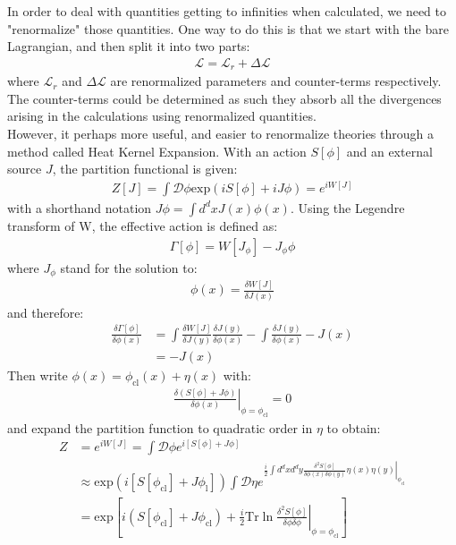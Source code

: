 \documentclass[fleqn]{article}
\begin{document}
In order to deal with quantities getting to infinities when calculated, we need to "renormalize" those quantities. One way to do this is that we start with the bare Lagrangian, and then split it into two parts:
\begin{align}
\mathcal{L} = \mathcal{L}_{r} + \Delta \mathcal{L}
\end{align}
where $\mathcal{L}_r$ and $\Delta \mathcal{L}$ are renormalized parameters and counter-terms respectively. The counter-terms could be determined as such they absorb all the divergences arising in the calculations using renormalized quantities. \\
\indent However, it perhaps more useful, and easier to renormalize theories through a method called Heat Kernel Expansion. With an action $S[\phi]$ and an external source $J$, the partition functional is given:
\begin{align}
Z[J] = \int \mathcal{D} \phi \text{exp}(iS[\phi] + iJ\phi) = e^{iW[J]}
\end{align}
with a shorthand notation $J\phi = \int d^{d} xJ(x) \phi(x)$. Using the Legendre transform of W, the effective action is defined as:
\begin{align}
\Gamma[\phi] = W[J_{\phi}] - J_{\phi}\phi
\end{align}
where $J_{\phi}$ stand for the solution to:
\begin{align}
\phi(x) = \frac{\delta W[J]}{\delta J(x)}
\end{align}
and therefore:
\begin{align}
\frac{\delta \Gamma[\phi]}{\delta \phi (x)} &= \int \frac{\delta W[J]}{\delta J(y)} \frac {\delta J(y)}{\delta \phi (x)} - \int \frac{\delta J(y)}{\delta \phi (x) }  - J(x) \nonumber \\
&= -J(x)
\end{align}
Then write $\phi (x)= \phi _{\text{cl}} (x)+ \eta(x)$ with:
\begin{align}
\left. \frac{\delta (S[\phi] + J\phi)}{\delta \phi (x)} \right|_{\phi = \phi_{\text{cl}}} = 0
\end{align}
and expand the partition function to quadratic order in $\eta$ to obtain:
\begin{align}
Z&= e^{iW[J]} = \int \mathcal{D} \phi e^{i[S[\phi] + J\phi]} \nonumber \\
& \approx \text{exp} (i[S[\phi_{\text{cl}}] + J\phi_{\text{l}}] ) \int \mathcal{D} \eta e^{\left. \frac{i}{2}\int d^{d}x d^{d}y \frac{\delta ^{2} S[\phi]}{\delta \phi(x) \delta \phi(y)} \eta(x)\eta(y) \right|_{\phi_{\text{cl}}}} \nonumber \\
& = \text{exp} [i(S[\phi_{\text{cl}}] +J\phi_{\text{cl}}) +\left. \frac{i}{2}\text{Tr} \ln \frac{\delta ^{2} S[\phi]}{\delta \phi \delta \phi} \right|_{\phi = \phi_{\text{cl}}}]
\end{align}
\end{document}
